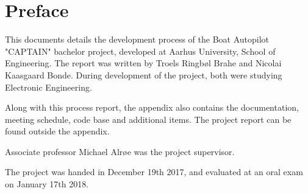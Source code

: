 \chapter{Preface}
This documents details the development process of the Boat Autopilot "CAPTAIN" bachelor project, developed at Aarhus University, School of Engineering. The report was written by Troels Ringbøl Brahe and Nicolai Kaasgaard Bonde. During development of the project, both were studying Electronic Engineering.

Along with this process report, the appendix also contains the documentation, meeting schedule, code base and additional items. The project report can be found outside the appendix.

Associate professor Michael Alrøe was the project supervisor. 

The project was handed in December 19th 2017, and evaluated at an oral exam on January 17th 2018.